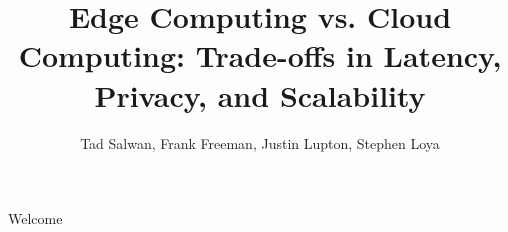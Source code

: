 \documentclass[10pt,a4paper]{article}
\title{Edge Computing vs. Cloud Computing: Trade-offs in Latency, Privacy, and Scalability}
\author{Tad Salwan, Frank Freeman, Justin Lupton, Stephen Loya}
\begin{document}
	\maketitle
	Welcome
\end{document}
